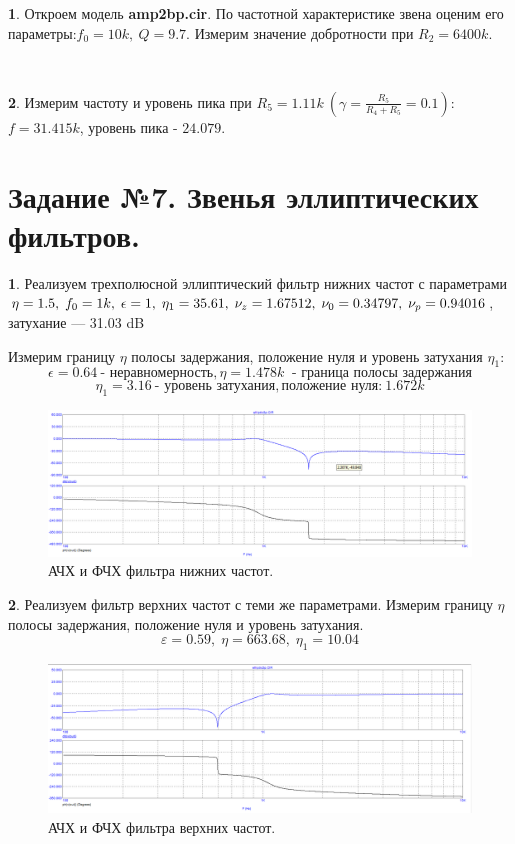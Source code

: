 \documentclass[a4paper, 12pt, twoside]{article}
\newcommand*{\hm}[1]{#1\nobreak\discretionary{}
	{\hbox{$\mathsurround=0pt #1$}}{}}
\begin{document}
\textbf{1}. Откроем модель \textbf{amp2bp.cir}. По частотной характеристике звена оценим его параметры:$f_0 = 10k,~Q=9.7$. Измерим значение добротности при $R_2 = 6400k$.

~

\textbf{2}. Измерим частоту и уровень пика при $R_5 = 1.11k ~ (\gamma = \frac{R_5}{R_4+R_5} = 0.1)$: $f = 31.415k$, уровень пика - $24.079$.

\newpage

\section*{Задание №7. Звенья эллиптических фильтров.}
\textbf{1}. Реализуем трехполюсной эллиптический фильтр нижних частот с параметрами $ \eta \hm{=} 1.5,\; f_0=1k,\; \epsilon=1,\; \eta_1 = 35.61,\; \nu_z = 1.67512,\; \nu_0=0.34797,\;\nu_p=0.94016 $, затухание  — 31.03 dB	


Измерим границу $\eta$ полосы задержания, положение нуля и уровень затухания $\eta_1$:
$$ \epsilon = 0.64 ~\text{- неравномерность},  \eta = 1.478k~\text{ - граница полосы задержания}$$
$$ \eta_1 = 3.16~\text{- уровень затухания}, \text{положение нуля:}~ 1.672k $$
 \begin{figure}[H]
	\centering
	\includegraphics[width =  0.9\linewidth]{7i}
	\caption{АЧХ и ФЧХ фильтра нижних частот.}
	
\end{figure}

\textbf{2}. Реализуем фильтр верхних частот с теми же параметрами. Измерим границу $\eta$ полосы задержания, положение нуля и уровень затухания.
 $$ \varepsilon=0.59,\; \eta = 663.68,\; \eta_1 = 10.04 $$
 \begin{figure}[H]
 	\centering
 	\includegraphics[width =  0.9\linewidth]{7d}
 	\caption{АЧХ и ФЧХ фильтра верхних частот.}
 	
 \end{figure}
\end{document}
